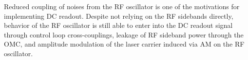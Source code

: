 \begin{figure}[]
\end{figure}


%
Reduced coupling of noises from the RF oscillator is one of the
motivations for implementing DC readout. Despite not relying on the RF
sidebands directly, behavior of the RF oscillator is still able to
enter into the DC readout signal through control loop cross-couplings,
leakage of RF sideband power through the OMC, and amplitude modulation
of the laser carrier induced via AM on the RF oscillator.

